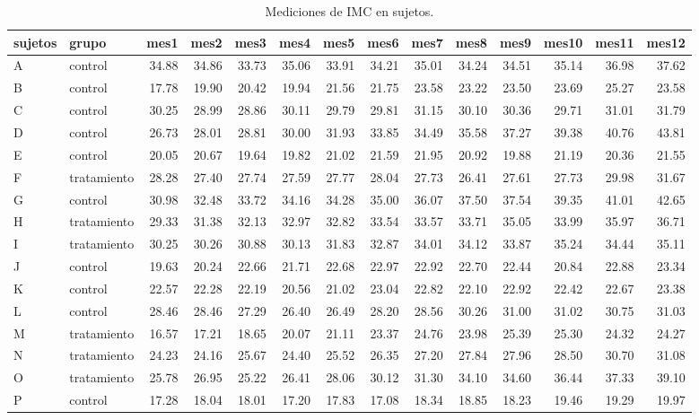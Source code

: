 \documentclass[]{article}
\begin{document}
\begin{table}[H]
\centering
\begingroup\tiny
\begin{tabular}{llrrrrrrrrrrrr}
  \hline
sujetos & grupo & mes1 & mes2 & mes3 & mes4 & mes5 & mes6 & mes7 & mes8 & mes9 & mes10 & mes11 & mes12 \\ 
  \hline
A & control & 34.88 & 34.86 & 33.73 & 35.06 & 33.91 & 34.21 & 35.01 & 34.24 & 34.51 & 35.14 & 36.98 & 37.62 \\ 
  B & control & 17.78 & 19.90 & 20.42 & 19.94 & 21.56 & 21.75 & 23.58 & 23.22 & 23.50 & 23.69 & 25.27 & 23.58 \\ 
  C & control & 30.25 & 28.99 & 28.86 & 30.11 & 29.79 & 29.81 & 31.15 & 30.10 & 30.36 & 29.71 & 31.01 & 31.79 \\ 
  D & control & 26.73 & 28.01 & 28.81 & 30.00 & 31.93 & 33.85 & 34.49 & 35.58 & 37.27 & 39.38 & 40.76 & 43.81 \\ 
  E & control & 20.05 & 20.67 & 19.64 & 19.82 & 21.02 & 21.59 & 21.95 & 20.92 & 19.88 & 21.19 & 20.36 & 21.55 \\ 
  F & tratamiento & 28.28 & 27.40 & 27.74 & 27.59 & 27.77 & 28.04 & 27.73 & 26.41 & 27.61 & 27.73 & 29.98 & 31.67 \\ 
  G & control & 30.98 & 32.48 & 33.72 & 34.16 & 34.28 & 35.00 & 36.07 & 37.50 & 37.54 & 39.35 & 41.01 & 42.65 \\ 
  H & tratamiento & 29.33 & 31.38 & 32.13 & 32.97 & 32.82 & 33.54 & 33.57 & 33.71 & 35.05 & 33.99 & 35.97 & 36.71 \\ 
  I & tratamiento & 30.25 & 30.26 & 30.88 & 30.13 & 31.83 & 32.87 & 34.01 & 34.12 & 33.87 & 35.24 & 34.44 & 35.11 \\ 
  J & control & 19.63 & 20.24 & 22.66 & 21.71 & 22.68 & 22.97 & 22.92 & 22.70 & 22.44 & 20.84 & 22.88 & 23.34 \\ 
  K & control & 22.57 & 22.28 & 22.19 & 20.56 & 21.02 & 23.04 & 22.82 & 22.10 & 22.92 & 22.42 & 22.67 & 23.38 \\ 
  L & control & 28.46 & 28.46 & 27.29 & 26.40 & 26.49 & 28.20 & 28.56 & 30.26 & 31.00 & 31.02 & 30.75 & 31.03 \\ 
  M & tratamiento & 16.57 & 17.21 & 18.65 & 20.07 & 21.11 & 23.37 & 24.76 & 23.98 & 25.39 & 25.30 & 24.32 & 24.27 \\ 
  N & tratamiento & 24.23 & 24.16 & 25.67 & 24.40 & 25.52 & 26.35 & 27.20 & 27.84 & 27.96 & 28.50 & 30.70 & 31.08 \\ 
  O & tratamiento & 25.78 & 26.95 & 25.22 & 26.41 & 28.06 & 30.12 & 31.30 & 34.10 & 34.60 & 36.44 & 37.33 & 39.10 \\ 
  P & control & 17.28 & 18.04 & 18.01 & 17.20 & 17.83 & 17.08 & 18.34 & 18.85 & 18.23 & 19.46 & 19.29 & 19.97 \\ 
   \hline
\end{tabular}
\endgroup
\caption{Mediciones de IMC en sujetos.} 
\label{tab:sujetos}
\end{table}
\end{document}
